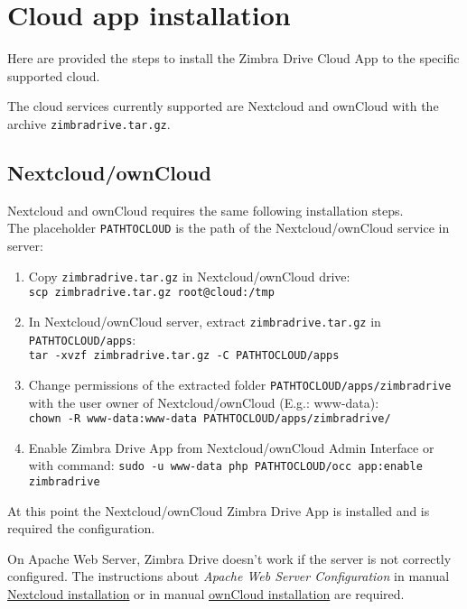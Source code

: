 \section{Cloud app installation}

Here are provided the steps to install the Zimbra Drive Cloud App to the specific supported cloud.
\begin{warning}
The cloud services currently supported are Nextcloud and ownCloud with the archive \texttt{zimbradrive.tar.gz}.
\end{warning}

\subsection{Nextcloud/ownCloud}\label{subsec:NextcloudownCloudInstallation}
    Nextcloud and ownCloud requires the same following installation steps.\\
    The placeholder \texttt{PATH\textunderscore TO\textunderscore CLOUD} is the path of the Nextcloud/ownCloud service in server:

    \begin{enumerate}
        \item Copy \texttt{zimbradrive.tar.gz} in Nextcloud/ownCloud drive:\\
        \texttt{scp zimbradrive.tar.gz root@cloud:/tmp}

        \item In Nextcloud/ownCloud server, extract \texttt{zimbradrive.tar.gz}  in \texttt{PATH\textunderscore TO\textunderscore CLOUD/apps}:\\
        \texttt{tar -xvzf zimbradrive.tar.gz -C \texttt{PATH\textunderscore TO\textunderscore CLOUD}/apps}
        
        \item Change permissions of the extracted folder \texttt{PATH\textunderscore TO\textunderscore CLOUD/apps/zimbradrive}
        with the user owner of Nextcloud/ownCloud (E.g.: www-data):\\
        \texttt{chown -R www-data:www-data PATH\textunderscore TO\textunderscore CLOUD/apps/zimbradrive/}
        
        \item Enable Zimbra Drive App from Nextcloud/ownCloud Admin Interface or with command: %
        \texttt{sudo -u www-data php PATH\textunderscore TO\textunderscore CLOUD/occ app:enable zimbradrive}
    \end{enumerate}

    At this point the Nextcloud/ownCloud Zimbra Drive App is installed and is required the configuration.
\begin{warning}
On Apache Web Server, Zimbra Drive doesn't work if the server is not correctly configured.
The instructions about \textit{Apache Web Server Configuration} in manual
\href{https://docs.nextcloud.com/server/11/admin_manual/installation/source_installation.html#apache-web-server-configuration}{Nextcloud installation}
or in manual
\href{https://doc.owncloud.org/server/10.0/admin_manual/installation/source_installation.html#apache-web-server-configuration}{ownCloud installation}
are required.
\end{warning}